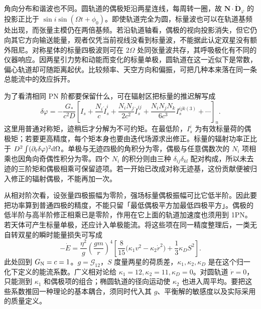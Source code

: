 角向分布和谐波也不同。圆轨道的偶极矩沿两星连线，每周转一圈，故 $\bm N\cdot\dot{\bm D}_\varphi$ 的投影正比于 $\sin i\sin(\Omega t+\phi_0)$。即使轨道完全为圆，标量波也可以在轨道基频处出现，而张量主模仍在两倍基频。若沿轨道轴看，偶极的视向投影消失，但它仍向其它方向输送能量，观者仅凭当前视线没看到标量波，不能据此认定双星没有额外阻尼。对称星体的标量四极波则可在 $2\Omega$ 处同张量波共存，其呼吸极化有不同的仪器响应。因两星引力势和动能而变化的标量单极，圆轨道在这一近似下是常数，偏心轨道却可随距离起伏。比较频率、天空方向和偏振，可把几种本来落在同一条总能流中的效应拆开。

为了看清相同 PN 阶都要保留什么，可在辐射区把标量的推迟解写成
\[
 \delta\varphi=-\frac{G_*}{c^2D}
 \left[I_s+\frac{N_i}{c}\dot I_s^i
       +\frac{N_iN_j}{2c^2}\ddot I_s^{ij}
       +\frac{N_iN_jN_k}{6c^3}I_s^{ijk(3)}+\cdots\right]_u .
\]
这里用普通对称矩，迹稍后才分解为不可约矩。在最低阶，$I_s^i$ 为有效标量荷的偶极矩；若要更高精度，每个矩本身也要由迭代场源求出修正。标量的辐射功率正比于 $D^2\int(\partial_t\delta\varphi)^2\dd\Omega$。单极与无迹四极的角积分为零，偶极与任意偶数次的 $N_i$ 项相乘也因角向奇偶性积分为零。四个 $N_i$ 的积分则由三种 $\delta_{ij}\delta_{kl}$ 配对构成，所以未去迹的三阶矩和偶极相乘可保留迹项。若一开始已改成对称无迹基，这份贡献便被归入修正的辐射偶极，不能再加一次。

从相对阶次看，设张量四极振幅为零阶，强场标量偶极振幅可比它低半阶。因此要把功率算到普通四极的精度，不能只留「最低偶极平方加最低四极平方」。偶极的低半阶与高半阶修正相乘已是零阶，作用在它上面的轨道加速度也须用到 1PN。若天体可产生标量单极，还应计入单极能流。将这些项在同一精度整理后，一类无自转双星的瞬时能量损失可写成
\[
 -\dot E=\frac{\eta^2}{g}\left(\frac{gm}{r}\right)^4
 \left[\frac{8}{15}\big(\kappa_1 v^2-\kappa_2\dot r^2\big)
        +\frac13\kappa_D S^2\right].
\]
此处回到 $G_{\rm N}=c=1$。$g=\mathcal G_{12}$，$S$ 度量两星的荷质差，$\kappa_1,\kappa_2,\kappa_D$ 是在这个归一化下定义的能流系数。广义相对论给 $\kappa_1=12,\kappa_2=11,\kappa_D=0$。对圆轨道 $\dot r=0$，只能测到 $\kappa_1$ 和偶极项的组合；椭圆轨道的径向运动使 $\kappa_2$ 也进入周平均。要把这些系数推回一种理论的基本耦合，须同时代入其 $g$、平衡解的敏感度以及实际采用的质量定义。

